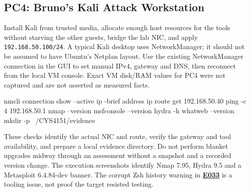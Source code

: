 \documentclass[11pt,a4paper]{article}
\newcommand{\ev}[1]{\hyperref[ev:#1]{\textbf{#1}}}
\begin{document}
\subsection{PC4: Bruno's Kali Attack Workstation}
Install Kali from trusted media, allocate enough host resources for the tools without starving the other guests, bridge the lab NIC, and apply \texttt{192.168.50.100/24}. A typical Kali desktop uses NetworkManager; it should not be assumed to have Ubuntu's Netplan layout. Use the existing NetworkManager connection in the GUI to set manual IPv4, gateway and DNS, then reconnect from the local VM console. Exact VM disk/RAM values for PC4 were not captured and are not asserted as measured facts.
\begin{cmdbox}
\begin{reportcode}
nmcli connection show --active
ip -brief address
ip route get 192.168.50.40
ping -c 4 192.168.50.1
nmap --version
msfconsole --version
hydra -h
whatweb --version
mkdir -p ~/CYS4151/evidence
\end{reportcode}
\end{cmdbox}
These checks identify the actual NIC and route, verify the gateway and tool availability, and prepare a local evidence directory. Do not perform blanket upgrades midway through an assessment without a snapshot and a recorded version change. The execution screenshots identify Nmap 7.95, Hydra 9.5 and a Metasploit 6.4.84-dev banner. The corrupt Zsh history warning in \ev{E033} is a tooling issue, not proof the target resisted testing.
\end{document}
